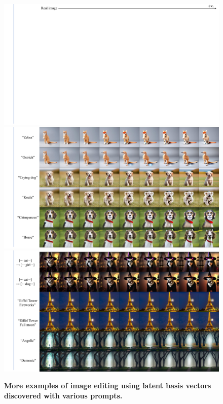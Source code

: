 \begin{figure}[!h]
    \centering
    \includegraphics[width=1.0\linewidth]{figure/top.pdf}
    \includegraphics[width=1.0\linewidth]{figure/stable_text_1.pdf}
    \includegraphics[width=1.0\linewidth]{figure/stable_text_2.pdf}
    \caption{
    \textbf{More examples of image editing using latent basis vectors discovered with various prompts.} }
    \label{fig:stable_text_more}
\end{figure}

